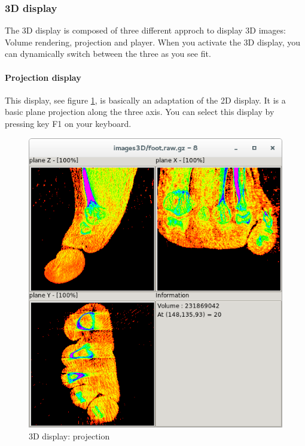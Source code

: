 \documentclass[a4paper,10pt,oneside]{article}
\begin{document}
\subsubsection{3D display}

The 3D display is composed of three different approch to display 3D images:
Volume rendering, projection and player. When you activate the 3D display,
you can dynamically switch between the three as you see fit.


\paragraph{Projection display}

This display, see figure \ref{fig:dis3D_proj}, is basically an adaptation of
the 2D display. It is a basic plane projection along the three axis.
You can select this display by pressing key F1 on your keyboard.

\begin{figure}
\centering
\includegraphics[scale=0.5]{images/dis3D_proj.png}
\caption{3D display: projection}
\label{fig:dis3D_proj}
\end{figure}
\end{document}
